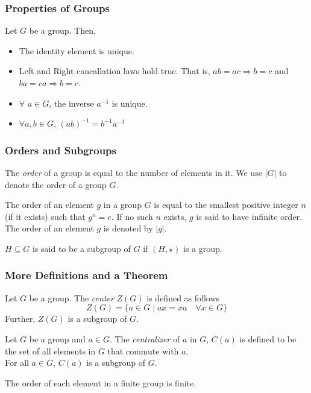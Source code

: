 \documentclass{beamer}
\begin{document}
	\begin{frame}
		\frametitle{Properties of Groups}
		\begin{theorem}
			Let $G$ be a group. Then,
			\begin{itemize}
				\item The identity element is unique.
				\item Left and Right cancallation laws hold true. That is, $ab = ac \Longrightarrow b = c$ and $ba = ca \Longrightarrow b = c$.
				\item $\forall$ $a\in G$, the inverse $a^{-1}$ is unique.
				\item $\forall a,b\in G$, $(ab)^{-1} = b^{-1}a^{-1}$
			\end{itemize}
		\end{theorem}
	\end{frame}
	
	\begin{frame}
		\frametitle{Orders and Subgroups}
		\begin{definition}
			The \textit{order} of a group is equal to the number of elements in it. We use $|G|$ to denote the order of a group $G$.
		\end{definition}
		\begin{definition}
			The order of an element $g$ in a group $G$ is equal to the smallest positive integer $n$ (if it exists) such that $g^n = e$. If no such $n$ exists, $g$ is said to have infinite order. The order of an element $g$ is denoted by $|g|$.
		\end{definition}
		\begin{definition}[Subgroup]
			$H\subseteq G$ is said to be a subgroup of $G$ if $(H,\star)$ is a group.
		\end{definition}
	\end{frame}
	
	\begin{frame}
		\frametitle{More Definitions and a Theorem}
		\begin{definition}
			Let $G$ be a group. The \textit{center} $Z(G)$ is defined as follows
			\begin{equation*}
				Z(G) = \{a\in G\mid ax = xa \quad \forall x\in G\}
			\end{equation*}
			Further, $Z(G)$ is a subgroup of $G$.
		\end{definition}
		\begin{definition}
			Let $G$ be a group and $a\in G$. The \textit{centralizer} of $a$ in $G$, $C(a)$ is defined to be the set of all elements in $G$ that commute with $a$.\\
			For all $a\in G$, $C(a)$ is a subgroup of $G$.
		\end{definition}
		\begin{theorem}
			The order of each element in a finite group is finite.
		\end{theorem}
	\end{frame}
	
\end{document}
